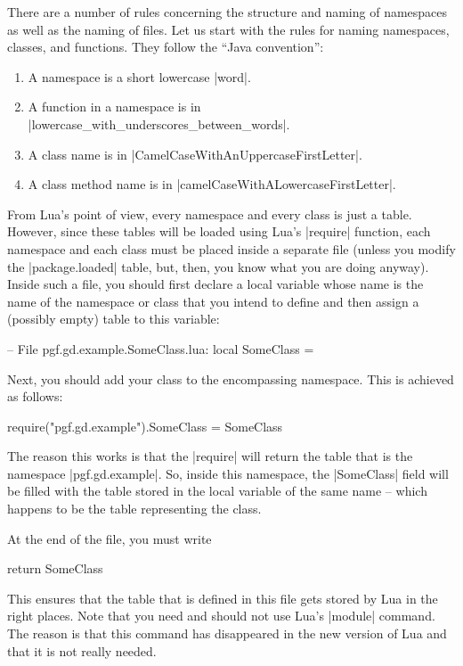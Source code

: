 There are a number of rules concerning the structure and naming of
namespaces as well as the naming of files. Let us start with the
rules for naming namespaces, classes, and functions. They follow the
``Java convention'':

\begin{enumerate}
\item A namespace is a short lowercase |word|.
\item A function in a namespace is in |lowercase_with_underscores_between_words|.
\item A class name is in |CamelCaseWithAnUppercaseFirstLetter|.
\item A class method name is in |camelCaseWithALowercaseFirstLetter|.
\end{enumerate}

From Lua's point of view, every namespace and every class is just a
table. However, since these tables will be loaded using Lua's
|require| function, each namespace and each class must be placed
inside a separate file (unless you modify the |package.loaded| table,
but, then, you know what you are doing anyway). Inside such a file, you
should first declare a local variable whose name is the name of the
namespace or class that you intend to define and then assign a
(possibly empty) table to this variable:
\begin{codeexample}
-- File pgf.gd.example.SomeClass.lua:
local SomeClass = {}
\end{codeexample}
Next, you should add your class to the encompassing namespace. This is
achieved as follows:
\begin{codeexample}
require("pgf.gd.example").SomeClass = SomeClass
\end{codeexample}
The reason this works is that the |require| will return the table that
is the namespace |pgf.gd.example|. So, inside this namespace, the
|SomeClass| field will be filled with the table stored in the local
variable of the same name -- which happens to be the table
representing the class.

At the end of the file, you must write
\begin{codeexample}
return SomeClass  
\end{codeexample}
This ensures that the table that is defined in this file gets stored
by Lua in the right places. Note that you need and should not use
Lua's |module| command. The reason is that this command has
disappeared in the new version of Lua and that it is not really
needed. 

